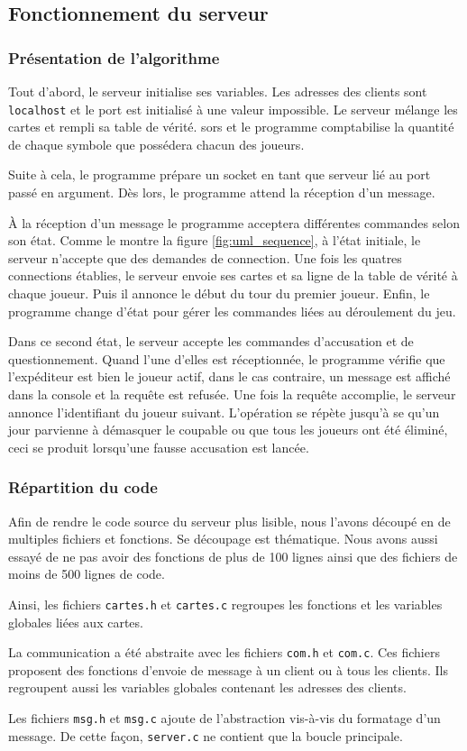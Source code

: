 \subsection{Fonctionnement du serveur}

\subsubsection{Présentation de l'algorithme}

Tout d'abord, le serveur initialise ses variables. Les adresses des clients sont
\verb|localhost| et le port est initialisé à une valeur impossible. Le serveur
mélange les cartes et rempli sa table de vérité. sors et le programme
comptabilise la quantité de chaque symbole que possédera chacun des joueurs.

Suite à cela, le programme prépare un socket en tant que serveur lié au port
passé en argument. Dès lors, le programme attend la réception d'un message.

À la réception d'un message le programme acceptera différentes commandes selon
son état. Comme le montre la figure \ref{fig:uml_sequence}, à l'état initiale,
le serveur n'accepte que des demandes de connection. Une fois les quatres
connections établies, le serveur envoie ses cartes et sa ligne de la table de
vérité à chaque joueur. Puis il annonce le début du tour du premier joueur.
Enfin, le programme change d'état pour gérer les commandes liées au déroulement
du jeu.

Dans ce second état, le serveur accepte les commandes d'accusation et de
questionnement. Quand l'une d'elles est réceptionnée, le programme vérifie que
l'expéditeur est bien le joueur actif, dans le cas contraire, un message est
affiché dans la console et la requête est refusée. Une fois la requête
accomplie, le serveur annonce l'identifiant du joueur suivant. L'opération se
répète jusqu'à se qu'un jour parvienne à démasquer le coupable ou que tous les
joueurs ont été éliminé, ceci se produit lorsqu'une fausse accusation est
lancée.

\subsubsection{Répartition du code}

Afin de rendre le code source du serveur plus lisible, nous l'avons découpé en
de multiples fichiers et fonctions. Se découpage est thématique. Nous avons
aussi essayé de ne pas avoir des fonctions de plus de 100 lignes ainsi que des
fichiers de moins de 500 lignes de code.

Ainsi, les fichiers \verb=cartes.h= et \verb=cartes.c= regroupes les fonctions
et les variables globales liées aux cartes.

La communication a été abstraite avec les fichiers \verb=com.h= et \verb=com.c=.
Ces fichiers proposent des fonctions d'envoie de message à un client ou à tous
les clients. Ils regroupent aussi les variables globales contenant les adresses
des clients.

Les fichiers \verb=msg.h= et \verb=msg.c= ajoute de l'abstraction vis-à-vis du
formatage d'un message. De cette façon, \verb=server.c= ne contient que la
boucle principale.
